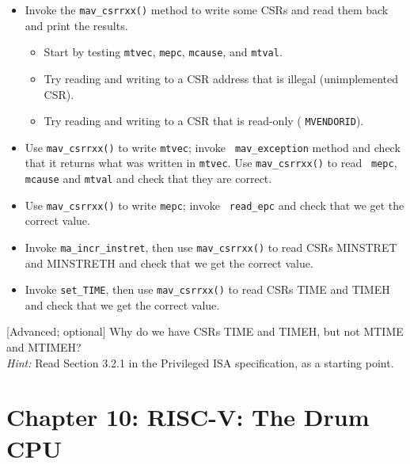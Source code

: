 \begin{itemize}

 \item Invoke the {\tt mav\_csrrxx()} method to write some CSRs and
       read them back and print the results.

   \begin{itemize}
     \item Start by testing {\tt mtvec}, {\tt mepc}, {\tt mcause}, and {\tt mtval}.

     \item Try reading and writing to a CSR address that is illegal (unimplemented CSR).

     \item Try reading and writing to a CSR that is read-only ({\eg} {\tt MVENDORID}).
   \end{itemize}

 \item Use {\tt mav\_csrrxx()} to write {\tt mtvec}; invoke {\tt
       mav\_exception} method and check that it returns what was
       written in {\tt mtvec}.  Use {\tt mav\_csrrxx()} to read {\tt
       mepc}, {\tt mcause} and {\tt mtval} and check that they are
       correct.

 \item Use {\tt mav\_csrrxx()} to write {\tt mepc}; invoke {\tt
       read\_epc} and check that we get the correct value.

 \item Invoke {\tt ma\_incr\_instret}, then use {\tt mav\_csrrxx()} to
       read CSRs MINSTRET and MINSTRETH and check that we get the
       correct value.

 \item Invoke {\tt set\_TIME}, then use {\tt mav\_csrrxx()} to
       read CSRs TIME and TIMEH and check that we get the
       correct value.

\end{itemize}

[Advanced; optional] Why do we have CSRs TIME and TIMEH, but not MTIME
and MTIMEH? \\
\emph{Hint:} Read Section 3.2.1 in the Privileged ISA
specification, as a starting point.


\hdivider

\section*{Chapter 10: RISC-V: The Drum CPU}

